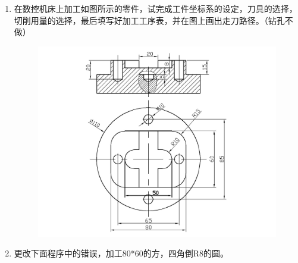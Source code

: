 \documentclass[12pt,twocolumn,landscape,UTF8,twoside,fontset=windows]{ctexart}%
\begin{document}
\begin{enumerate} [1.]
	\item 在数控机床上加工如图所示的零件，试完成工件坐标系的设定，刀具的选择，切削用量的选择，最后填写好加工工序表，并在图上画出走刀路径。（钻孔不做）
	      \begin{figure}[pht]
		      \centering
		      \includegraphics[width=0.5\linewidth]{figures/1.jpg}
		      \label{fig:1}
	      \end{figure}
	      \newpage
	\item 更改下面程序中的错误，加工80*60的方，四角倒R8的圆。
\end{enumerate}
\end{document}

